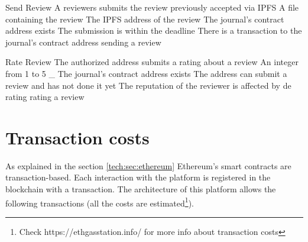 {Send Review}%
{A reviewers submits the review previously accepted via
  IPFS}%
{A file containing the review}%
{The IPFS address of the review}%
{The journal's contract address exists}%
{The submission is within the deadline}%
{There is a transaction to the journal's contract address}%
{sending a review}%

{Rate Review}%
{The authorized address submits a rating about a review}%
{An integer from 1 to 5}%
{_}%
{The journal's contract address exists}%
{The address can submit a review and has not done it yet}%
{The reputation of the reviewer is affected by de rating}%
{rating a review}%
\section{Transaction costs}
\label{arch:trans}

As explained in the section \ref{tech:sec:ethereum} Ethereum's smart contracts
are transaction-based. Each interaction with the platform is registered in the
blockchain with a transaction. The architecture of this platform allows the
following transactions (all the costs are estimated\footnote{Check
  https://ethgasstation.info/ for more info about transaction costs}).

